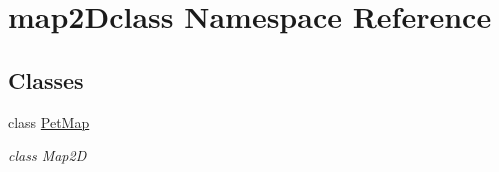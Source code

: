 \hypertarget{namespacemap2Dclass}{}\section{map2\+Dclass Namespace Reference}
\label{namespacemap2Dclass}
\subsection*{Classes}
\begin{DoxyCompactItemize}
\item 
class \hyperlink{classmap2Dclass_1_1PetMap}{Pet\+Map}
\begin{DoxyCompactList}\small\item\em class Map2D \end{DoxyCompactList}\end{DoxyCompactItemize}
